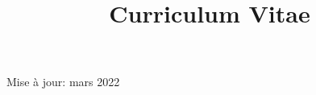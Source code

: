 \documentclass[a4paper,12pt]{curve}
\title{Curriculum Vitae}
\begin{document}
            \makeheaders[t]
            \begin{center}
Mise à jour: mars 2022
\end{center}
            \vfill
            
\end{document}

